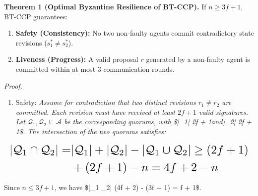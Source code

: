 \documentclass[10pt,journal,compsoc,twocolumn]{IEEEtran}
\begin{document}
\textbf{Theorem 1 (Optimal Byzantine Resilience of BT-CCP).} If $n \ge 3f + 1$, BT-CCP guarantees:
\begin{enumerate}
  \item \textbf{Safety (Consistency):} No two non-faulty agents commit contradictory state revisions ($s_1^* \ne s_2^*$).
  \item \textbf{Liveness (Progress):} A valid proposal $r$ generated by a non-faulty agent is committed within at most 3 communication rounds.
\end{enumerate}

\textit{Proof.} 
\begin{enumerate}
  \item Safety:\textit{ Assume for contradiction that two distinct revisions $r_1 \ne r_2$ are committed. Each revision must have received at least $2f + 1$ valid signatures. Let $\mathcal{Q}_1, \mathcal{Q}_2 \subseteq \mathcal{A}$ be the corresponding quorums, with \$|\_1| \ge 2f + 1$ and $|\_2| \ge 2f + 1\$. The intersection of the two quorums satisfies:}
\end{enumerate}





















\begin{equation}
\resizebox{\columnwidth}{!}{$\displaystyle
\begin{aligned}
|\mathcal{Q}_1 \cap \mathcal{Q}_2| = & |\mathcal{Q}_1| + |\mathcal{Q}_2| - |\mathcal{Q}_1 \cup \mathcal{Q}_2| \ge (2f + 1) \\
& + (2f + 1) - n = 4f + 2 - n
\end{aligned}
$}
\end{equation}





















Since $n \le 3f + 1$, we have \$|\_1 \cap {}\_2| \ge (4f + 2) - (3f + 1) = f + 1\$. 
\end{document}
